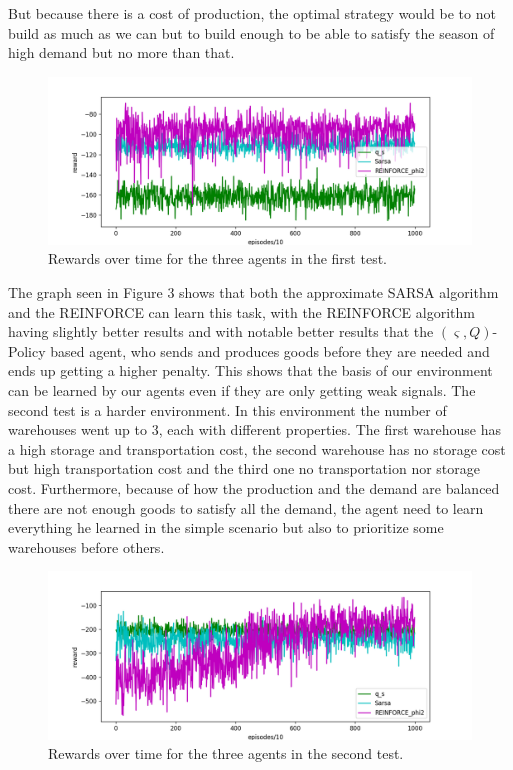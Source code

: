 \documentclass[journal, a4paper]{IEEEtran}
\theoremstyle{plain}
\theoremstyle{definition}
\begin{document}
 But because there is a cost of production, the optimal strategy would be to not build as much as we can but to build enough to be able to satisfy the season of high demand but no more than that.
\begin{figure}[h]
	\centering
	\includegraphics[width=\columnwidth]{medium_2_env_rewards.png}
	\caption{\label{medium_2_env_rewards} Rewards over time for the three agents in the first test.}
\end{figure}
\newline
The graph seen in Figure 3 shows that both the approximate SARSA algorithm and the REINFORCE can learn this task, with the REINFORCE algorithm having slightly better results and with notable better results that the $(\varsigma, Q)$-Policy based agent, who sends and produces goods before they are needed and ends up getting a higher penalty. This shows that the basis of our environment can be learned by our agents even if they are only getting weak signals.\newline
The second test is a harder environment. In this environment the number of warehouses went up to 3, each with different properties. The first warehouse has a high storage and transportation cost, the second warehouse has no storage cost but high transportation cost and the third one no transportation nor storage cost. Furthermore, because of how the production and the demand are balanced there are not enough goods to satisfy all the demand, the agent need to learn everything he learned in the simple scenario but also to prioritize some warehouses before others.
\begin{figure}[h]
	\centering
	\includegraphics[width=\columnwidth]{weird_2_env_rewards.png}
	\caption{\label{weird_2_env_rewards} Rewards over time for the three agents in the second test.}
\end{figure}
\end{document}
